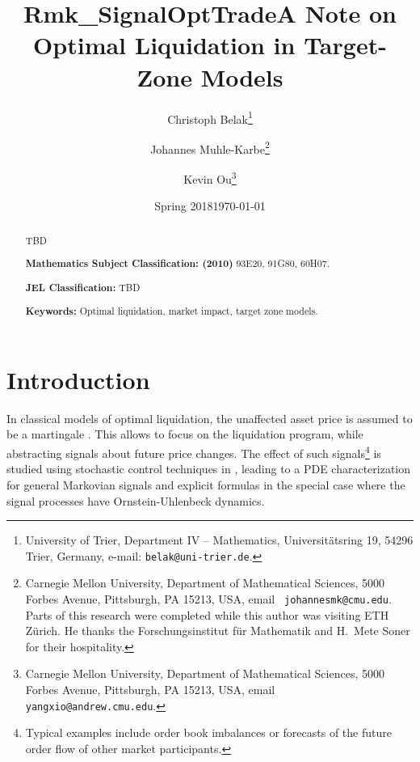 \documentclass[11pt]{article}
\title{Rmk_SignalOptTrade}
\date{Spring 2018}
\theoremstyle{definition}
\theoremstyle{remark}
\begin{document}
\title{A Note on Optimal Liquidation in Target-Zone Models}

\author{
Christoph Belak\thanks{University of Trier, Department IV -- Mathematics, Universit\"atsring 19, 54296 Trier, Germany, e-mail: \texttt{belak@uni-trier.de}.}
\and
Johannes Muhle-Karbe\thanks{Carnegie Mellon University, Department of Mathematical Sciences, 5000 Forbes Avenue, Pittsburgh, PA 15213, USA, email \texttt{ johannesmk@cmu.edu}. Parts of this research were completed while this author was visiting ETH Z\"urich. He thanks the Forschungsinstitut f\"ur Mathematik and H.~Mete Soner for their hospitality. }
\and
Kevin Ou\thanks{Carnegie Mellon University, Department of Mathematical Sciences, 5000 Forbes Avenue, Pittsburgh, PA 15213, USA, email \texttt{ yangxio@andrew.cmu.edu}.}
}

\date{\today}

\maketitle

\begin{abstract}
TBD

\bigskip
\noindent\textbf{Mathematics Subject Classification: (2010)} 93E20, 91G80, 60H07.

\bigskip
\noindent\textbf{JEL Classification:} TBD

\bigskip
\noindent\textbf{Keywords:} Optimal liquidation, market impact, target zone models.

\end{abstract}




\section{Introduction}

In classical models of optimal liquidation, the unaffected asset price is assumed to be a martingale \cite{almgren.chriss.01,almgren.01,obizhaeva.wang.13,alfonsi.al.??,predoiu.??}. This allows to focus on the liquidation program, while abstracting signals about future price changes. The effect of such signals\footnote{Typical examples include order book imbalances \cite{} or forecasts of the future order flow of other market participants.} is studied using stochastic control techniques in \cite{cartea.jaimungal.??,lehalle2017incorporating}, leading to a PDE characterization for general Markovian signals and explicit formulas in the special case where the signal processes have Ornstein-Uhlenbeck dynamics. 
\end{document}
